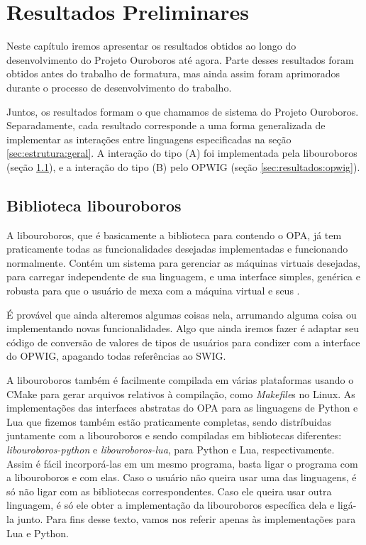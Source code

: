 \chapter{Resultados Preliminares}
\label{sec:resultados}

Neste capítulo iremos apresentar os resultados obtidos ao longo do
desenvolvimento do Projeto Ouroboros até agora. Parte desses resultados foram
obtidos antes do trabalho de formatura, mas ainda assim foram aprimorados
durante o processo de desenvolvimento do trabalho.

Juntos, os resultados formam o que chamamos de sistema do Projeto Ouroboros.
Separadamente, cada resultado corresponde a uma forma generalizada de implementar
as interações entre linguagens especificadas na seção \ref{sec:estrutura:geral}.
A interação do tipo (A) foi implementada pela libouroboros (seção 
\ref{sec:resultados:libouroboros}), e a interação do tipo (B) pelo 
OPWIG (seção \ref{sec:resultados:opwig}).


\section{Biblioteca \textbf{libouroboros}}
\label{sec:resultados:libouroboros}
A libouroboros, que é basicamente a biblioteca para \CXX{} contendo o OPA,
já tem praticamente todas as funcionalidades desejadas implementadas e
funcionando normalmente. Contém um sistema para gerenciar as máquinas
virtuais desejadas, para carregar  independente de sua
linguagem, e uma interface simples, genérica e robusta para
que o usuário de \CXX{} mexa com a máquina virtual e seus .

É provável que ainda alteremos algumas coisas nela, arrumando alguma
coisa ou implementando novas funcionalidades. Algo que ainda iremos
fazer é adaptar seu código de conversão de valores de tipos de usuários
para condizer com a interface do OPWIG, apagando todas referências ao
SWIG.

A libouroboros também é facilmente compilada em várias plataformas usando
o CMake para gerar arquivos relativos à compilação, como \textit{Makefile}s
no Linux. As implementações das interfaces abstratas do OPA para as linguagens
de \script{} Python e Lua que fizemos também estão praticamente completas,
sendo distríbuidas juntamente com a libouroboros e sendo compiladas em
bibliotecas diferentes: \emph{libouroboros-python} e \emph{libouroboros-lua},
para Python e Lua, respectivamente. Assim é fácil incorporá-las em um
mesmo programa, basta ligar o programa com a libouroboros e com elas. 
Caso o usuário não queira usar uma das linguagens, é só não ligar com 
as bibliotecas correspondentes. Caso ele queira usar outra linguagem, é
só ele obter a implementação da libouroboros específica dela e ligá-la junto.
Para fins desse texto, vamos nos referir apenas às implementações para
Lua e Python.

